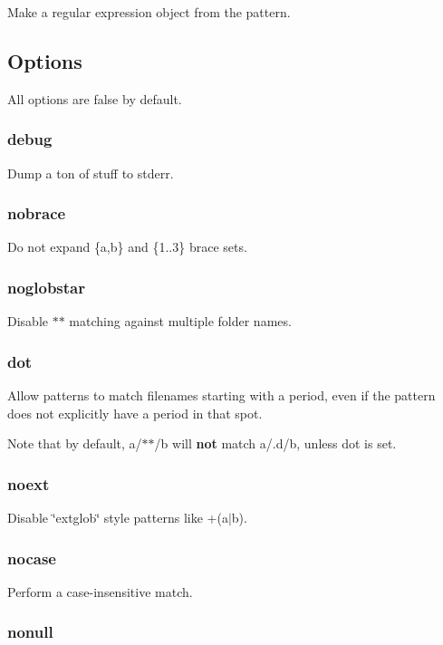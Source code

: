 Make a regular expression object from the pattern.

\subsection*{Options}

All options are {\ttfamily false} by default.

\subsubsection*{debug}

Dump a ton of stuff to stderr.

\subsubsection*{nobrace}

Do not expand {\ttfamily \{a,b\}} and {\ttfamily \{1..3\}} brace sets.

\subsubsection*{noglobstar}

Disable {\ttfamily $\ast$$\ast$} matching against multiple folder names.

\subsubsection*{dot}

Allow patterns to match filenames starting with a period, even if the pattern does not explicitly have a period in that spot.

Note that by default, {\ttfamily a/$\ast$$\ast$/b} will {\bfseries not} match {\ttfamily a/.d/b}, unless {\ttfamily dot} is set.

\subsubsection*{noext}

Disable \char`\"{}extglob\char`\"{} style patterns like {\ttfamily +(a$\vert$b)}.

\subsubsection*{nocase}

Perform a case-\/insensitive match.

\subsubsection*{nonull}

